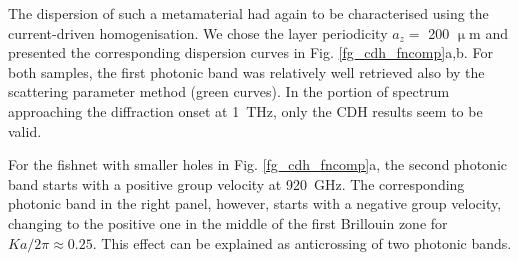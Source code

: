 The dispersion of such a metamaterial had again to be characterised using the current-driven homogenisation. We chose the layer periodicity $a_z = $ 200 $\upmu$m and presented the corresponding dispersion curves in Fig. \ref{fg_cdh_fncomp}a,b. For both samples, the first photonic band was relatively well retrieved also by the scattering parameter method (green curves). In the portion of spectrum approaching the diffraction onset at 1~THz, only the CDH results seem to be valid. 

For the fishnet with smaller holes in Fig. \ref{fg_cdh_fncomp}a, the second photonic band starts with a positive group velocity at 920~GHz. The corresponding photonic band in the right panel, however, starts with a negative group velocity, changing to the positive one in the middle of the first Brillouin zone for $Ka/2\pi \approx 0.25$. This effect can be explained as anticrossing of two photonic bands. %




